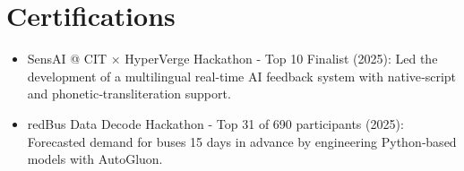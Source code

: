 \documentclass[letterpaper,11pt]{article}
\newcommand{\resumeItem}[1]{
  \item\small{
    {#1 \vspace{-2pt}}
  }
}
\newcommand{\resumeItemListStart}{\begin{itemize}}
\newcommand{\resumeItemListEnd}{\end{itemize}\vspace{-5pt}}
\begin{document}
\section{Certifications}
\resumeItemListStart
    \resumeItem{SensAI @ CIT × HyperVerge Hackathon - Top 10 Finalist (2025): Led the development of a multilingual real-time AI feedback system with native‑script and phonetic‑transliteration support.}
    \resumeItem{redBus Data Decode Hackathon - Top 31 of 690 participants (2025): Forecasted demand for buses 15 days in advance by engineering Python‑based models with AutoGluon.}
\resumeItemListEnd
\end{document}
